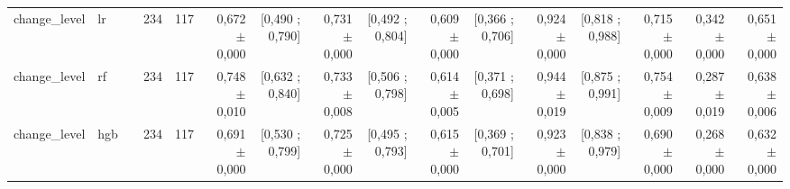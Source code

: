 \begin{table}[htbp]
{\begin{tabular}{llrrrrrrrrrrrrrr}
change\_level & lr &  & 234 & 117 & 0,672 $\pm$ 0,000 & [0,490 ; 0,790] & 0,731 $\pm$ 0,000 & [0,492 ; 0,804] & 0,609 $\pm$ 0,000 & [0,366 ; 0,706] & 0,924 $\pm$ 0,000 & [0,818 ; 0,988] & 0,715 $\pm$ 0,000 & 0,342 $\pm$ 0,000 & 0,651 $\pm$ 0,000 \\
change\_level & rf &  & 234 & 117 & 0,748 $\pm$ 0,010 & [0,632 ; 0,840] & 0,733 $\pm$ 0,008 & [0,506 ; 0,798] & 0,614 $\pm$ 0,005 & [0,371 ; 0,698] & 0,944 $\pm$ 0,019 & [0,875 ; 0,991] & 0,754 $\pm$ 0,009 & 0,287 $\pm$ 0,019 & 0,638 $\pm$ 0,006 \\
change\_level & hgb &  & 234 & 117 & 0,691 $\pm$ 0,000 & [0,530 ; 0,799] & 0,725 $\pm$ 0,000 & [0,495 ; 0,793] & 0,615 $\pm$ 0,000 & [0,369 ; 0,701] & 0,923 $\pm$ 0,000 & [0,838 ; 0,979] & 0,690 $\pm$ 0,000 & 0,268 $\pm$ 0,000 & 0,632 $\pm$ 0,000 \\
\bottomrule
\end{tabular}}
\end{table}
